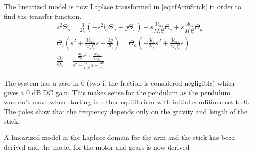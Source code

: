 The linearized model is now Laplace transformed in \autoref{eq:tfArmStick} in order to find the transfer function.
\begin{subequations}
\begin{flalign}
& s^2\Theta_s=\frac{3}{2l_s}\left(-s^2l_a\Theta_a +g\Theta_s\right)-s\frac{3b_{as}}{M_sl_s^2}\Theta_s+s\frac{3b_{as}}{M_sl_s^2}\Theta_a  \\
& \Theta_s\left(s^2+\frac{3b_{as}}{M_sl_s^2}s-\frac{3g}{2l_s}\right)=\Theta_a\left(-\frac{3l_a}{2l_s}s^2+\frac{3b_{as}}{M_sl_s^2}s\right)  \\
& \frac{\Theta_s}{\Theta_a}=\frac{-\frac{3l_a}{2l_s}s^2+\frac{3b_{as}}{M_sl_s^2}s}{s^2+\frac{3b_{as}}{M_sl_s^2}s-\frac{3g}{2l_s}} \label{eq:tfArmStick}
\end{flalign}
\end{subequations}

The system has a zero in 0 (two if the friction is considered negligible) which gives a 0 dB DC gain. This makes sense for the pendulum as the pendulum wouldn't move when starting in either equilibrium with initial conditions set to 0. The poles show that the frequency depends only on the gravity and length of the stick.

A linearized model in the Laplace domain for the arm and the stick has been derived and the model for the motor and gears is now derived.
